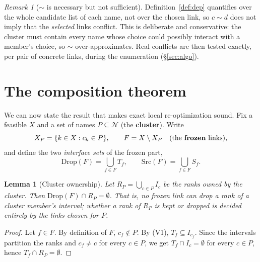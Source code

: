 \documentclass[11pt,a4paper]{article}
\theoremstyle{definition}
\theoremstyle{plain}
\newtheorem{lemma}[theorem]{Lemma}
\theoremstyle{remark}
\newtheorem{remark}{Remark}
\newcommand{\Names}{\mathcal{N}}
\begin{document}
\begin{remark}[$\sim$ is necessary but not sufficient]
Definition~\ref{def:dep} quantifies over the whole candidate list of each
name, not over the chosen link, so $c \sim d$ does not imply that the
\emph{selected} links conflict. This is deliberate and conservative: the
cluster must contain every name whose choice could possibly interact with
a member's choice, so $\sim$ over-approximates. Real conflicts are then
tested exactly, per pair of concrete links, during the enumeration
(\S\ref{sec:algo}).
\end{remark}

\section{The composition theorem}
\label{sec:compose}

We can now state the result that makes exact local re-optimization
sound. Fix a feasible $X$ and a set of names $P \subseteq \Names$ (the
\textbf{cluster}). Write
\[
  X_P = \{k \in X : c_k \in P\},
  \qquad
  F = X \setminus X_P \quad (\text{the \textbf{frozen} links}),
\]
and define the two \emph{interface sets} of the frozen part,
\[
  \mathrm{Drop}(F) = \bigcup_{f \in F} T_f,
  \qquad
  \mathrm{Src}(F) = \bigcup_{f \in F} S_f .
\]

\begin{lemma}[Cluster ownership]
\label{lem:ownership}
Let $R_P = \bigcup_{c \in P} I_c$ be the ranks owned by the cluster.
Then $\mathrm{Drop}(F) \cap R_P = \emptyset$. That is, no frozen link can
drop a rank of a cluster member's interval; whether a rank of $R_P$ is
kept or dropped is decided entirely by the links chosen for $P$.
\end{lemma}

\begin{proof}
Let $f \in F$. By definition of $F$, $c_f \notin P$. By (V1),
$T_f \subseteq I_{c_f}$. Since the intervals partition the ranks and
$c_f \ne c$ for every $c \in P$, we get
$T_f \cap I_c = \emptyset$ for every $c \in P$, hence
$T_f \cap R_P = \emptyset$.
\end{proof}
\end{document}
